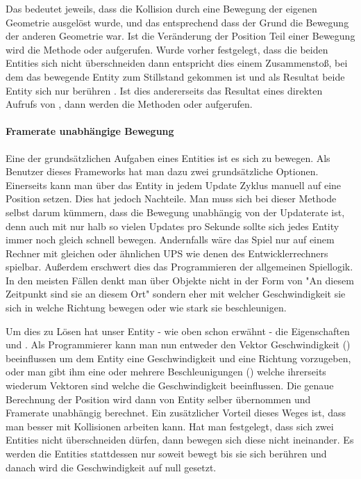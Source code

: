 Das  bedeutet jeweils, dass die Kollision durch eine Bewegung der eigenen Geometrie ausgelöst wurde, und das  entsprechend dass der Grund die Bewegung der anderen Geometrie war.
Ist die Veränderung der Position Teil einer Bewegung wird die Methode  oder  aufgerufen. Wurde vorher festgelegt, dass die beiden Entities sich nicht überschneiden dann entspricht dies einem Zusammenstoß, bei dem das bewegende Entity zum Stillstand gekommen ist und als Resultat beide Entity sich nur berühren .
Ist dies andererseits das Resultat eines direkten Aufrufs von , dann werden die Methoden  oder  aufgerufen.

\paragraph{Framerate unabhängige Bewegung}

Eine der grundsätzlichen Aufgaben eines Entities ist es sich zu bewegen. Als Benutzer dieses Frameworks hat man dazu zwei grundsätzliche Optionen.
Einerseits kann man über  das Entity in jedem Update Zyklus manuell auf eine Position setzen.
Dies hat jedoch Nachteile. 
Man muss sich bei dieser Methode selbst darum kümmern, dass die Bewegung unabhängig von der Updaterate ist, denn auch mit nur halb so vielen Updates pro Sekunde sollte sich jedes Entity immer noch gleich schnell bewegen. Andernfalls wäre das Spiel nur auf einem Rechner mit gleichen oder ähnlichen UPS  wie denen des Entwicklerrechners spielbar.
Außerdem erschwert dies das Programmieren der allgemeinen Spiellogik. In den meisten Fällen denkt man über Objekte nicht in der Form von "An diesem Zeitpunkt sind sie an diesem Ort" sondern eher mit welcher Geschwindigkeit sie sich in welche Richtung bewegen oder wie stark sie beschleunigen.

Um dies zu Lösen hat unser Entity - wie oben schon erwähnt - die Eigenschaften  und . Als Programmierer kann man nun entweder den Vektor Geschwindigkeit () beeinflussen um dem Entity eine Geschwindigkeit und eine Richtung vorzugeben, oder man gibt ihm eine oder mehrere Beschleunigungen () welche ihrerseits wiederum Vektoren sind welche die Geschwindigkeit beeinflussen. Die genaue Berechnung der Position wird dann von Entity selber übernommen und Framerate unabhängig berechnet. Ein zusätzlicher Vorteil dieses Weges ist, dass man besser mit Kollisionen arbeiten kann. Hat man festgelegt, dass sich zwei Entities nicht überschneiden dürfen, dann bewegen sich diese nicht ineinander. Es werden die Entities stattdessen nur soweit bewegt bis sie sich berühren und danach wird die Geschwindigkeit auf null gesetzt.

